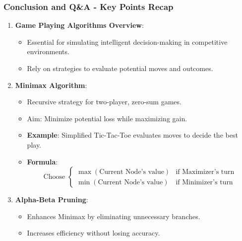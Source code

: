 \documentclass[aspectratio=169]{beamer}
\begin{document}
\begin{frame}[fragile]
    \frametitle{Conclusion and Q\&A - Key Points Recap}
    \begin{enumerate}
        \item \textbf{Game Playing Algorithms Overview}:
        \begin{itemize}
            \item Essential for simulating intelligent decision-making in competitive environments.
            \item Rely on strategies to evaluate potential moves and outcomes.
        \end{itemize}
        
        \item \textbf{Minimax Algorithm}:
        \begin{itemize}
            \item Recursive strategy for two-player, zero-sum games.
            \item Aim: Minimize potential loss while maximizing gain.
            \item \textbf{Example}: Simplified Tic-Tac-Toe evaluates moves to decide the best play.
            \item \textbf{Formula}:
                \begin{equation}
                    \text{Choose } 
                    \begin{cases}
                        \max(\text{Current Node's value}) & \text{if Maximizer's turn} \\
                        \min(\text{Current Node's value}) & \text{if Minimizer's turn}
                    \end{cases}
                \end{equation}
        \end{itemize}
        
        \item \textbf{Alpha-Beta Pruning}:
        \begin{itemize}
            \item Enhances Minimax by eliminating unnecessary branches.
            \item Increases efficiency without losing accuracy.
        \end{itemize}
    \end{enumerate}
\end{frame}
\end{document}
